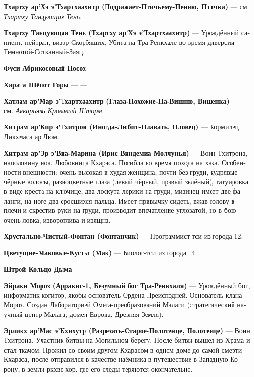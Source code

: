 \documentclass[a4paper,12pt,fleqn]{book}\usepackage{cooltooltips}\usepackage{polyglossia}\setdefaultlanguage[babelshorthands=true]{russian}\setotherlanguage{english}\defaultfontfeatures{Ligatures=TeX,Mapping=tex-text} \usepackage{xcolor}\definecolor{lightgray}{HTML}{bbbbbb}\color{lightgray}\newcommand{\ml}[3]{\textenglish{\textcolor{black}{#3}}}
\newcommand{\theterm}[3]{\textbf{\hypertarget{#1}{#2}} --- #3}
\newcommand{\thesynonim}[3]{\textbf{#2} --- см. \textit{\hyperlink{#1}{#3}}.}
\begin{document}
{\thesynonim{dancing-shadow}
{Тхартху ар’Хэ э’Тхартхаахитр (Подражает-Птичьему-Пению, Птичка)}
{Тхартху Танцующая Тень}

\theterm{dancing-shadow}
{Тхартху Танцующая Тень (Тхартху ар’Хэ э’Тхартхаахитр)}
{Урождённый сапиент, нейтрал, визор Скорбящих.
Убита на Тра-Ренкхале во время диверсии Темнотой-Сотканный-Заяц.}

\theterm{fuxi}
{Фуси Абрикосовый Посох}
{---}

\theterm{jarata}
{Харата Шёпот Горы}
{---}

\thesynonim{ancarjal}
{Хатлам ар’Мар э’Тхартхаахитр (Глаза-Похожие-На-Вишню, Вишенка)}
{Анкарьяль Кровавый Шторм}

\theterm{nurse-chitram}
{Хитрам ар’Кир э’Тхитрон (Иногда-Любит-Плавать, Пловец)}
{Кормилец Ликхмаса ар'Люм.}

\theterm{chitram-warrior}
{Хитрам ар'Эр э'Виа-Марина (Ирис Виндемиа Молчунья)}
{Воин Тхитрона, наполовину ноа.
Любовница Кхараса.
Погибла во время похода на хака.
Особенности внешности: очень высокая и худая женщина, почти без груди, кудрявые чёрные волосы, разноцветные глаза (левый чёрный, правый зелёный), татуировка в виде креста на ключице, два лоскута лорики на груди, мизинец имеет две фаланги, на ноге два сросшихся пальца.
Имеет привычку сидеть, вжав голову в плечи и скрестив руки на груди, производит впечатление угловатой, но в бою очень ловка, изворотлива и изящна.}

\theterm{fountain} %
{Хрустально-Чистый-Фонтан (Фонтанчик)}
{Программист-тси из города 12.}

\theterm{blooming-poppy-bush}
{Цветущие-Маковые-Кусты (Мак)}
{Биолог-тси из города 14.}

\theterm{stroji} %
{Штрой Кольцо Дыма}
{---}

\theterm{ejraci} %
{Эйраки Мороз (Арракис-1, Безумный бог Тра-Ренкхаля)}
{Урождённый бог, информатик-когитор, якобы основатель Ордена Преисподней.
Основатель клана Мороз.
Создан Лабораторией Омега-преобразований Малаги (стратегический научный центр Малага, домен Европа, Древняя Земля).}

\theterm{oerlikch}
{Эрликх ар'Мас э'Кхихутр (Разрезать-Старое-Полотенце, Полотенце)}
{Воин Тхитрона.
Участник битвы на Могильном берегу.
После битвы вышел из Храма и стал ткачом.
Прожил со своим другом Кхарасом в одном доме до самой смерти Кхараса, после отправился в качестве наёмника в путешествие в Западную Корону, в земли ркхве-хор, где его следы теряются окончательно.}

}
\end{document}
